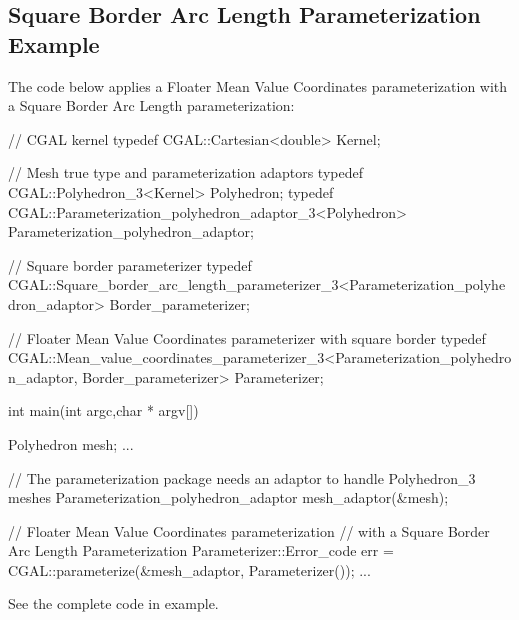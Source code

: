 \subsection{Square Border Arc Length Parameterization Example}

The code below applies a Floater Mean Value Coordinates parameterization
with a Square Border Arc Length parameterization:

\begin{ccExampleCode}

// CGAL kernel
typedef CGAL::Cartesian<double>                         Kernel;

// Mesh true type and parameterization adaptors
typedef CGAL::Polyhedron_3<Kernel>                      Polyhedron;
typedef CGAL::Parameterization_polyhedron_adaptor_3<Polyhedron>     
                                                        Parameterization_polyhedron_adaptor;

// Square border parameterizer
typedef CGAL::Square_border_arc_length_parameterizer_3<Parameterization_polyhedron_adaptor>
                                                       Border_parameterizer;

// Floater Mean Value Coordinates parameterizer with square border
typedef CGAL::Mean_value_coordinates_parameterizer_3<Parameterization_polyhedron_adaptor,
                                                     Border_parameterizer>
                                                        Parameterizer;

int main(int argc,char * argv[])
{
    Polyhedron mesh;
    ...

    // The parameterization package needs an adaptor to handle Polyhedron_3 meshes
    Parameterization_polyhedron_adaptor mesh_adaptor(&mesh);

    // Floater Mean Value Coordinates parameterization
    // with a Square Border Arc Length Parameterization
    Parameterizer::Error_code err = CGAL::parameterize(&mesh_adaptor, Parameterizer());
    ...
}

\end{ccExampleCode}

See the complete code in  example.
